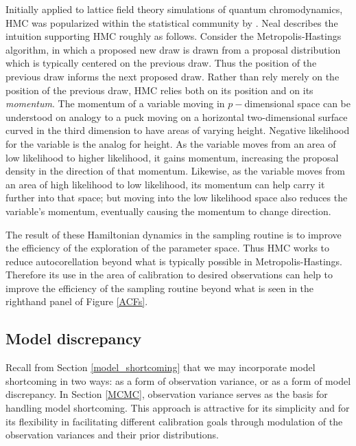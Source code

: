 \documentclass{article}
\begin{document}
Initially applied to lattice field theory simulations of quantum chromodynamics, HMC was popularized within the statistical community by \cite{Neal2011}. Neal describes the intuition supporting HMC roughly as follows. Consider the Metropolis-Hastings algorithm, in which a proposed new draw is drawn from a proposal distribution which is typically centered on the previous draw. Thus the position of the previous draw informs the next proposed draw. Rather than rely merely on the position of the previous draw, HMC relies both on its position and on its \emph{momentum}. The momentum of a variable moving in $p-$dimensional space can be understood on analogy to a puck moving on a horizontal two-dimensional surface curved in the third dimension to have areas of varying height. Negative likelihood for the variable is the analog for height. As the variable moves from an area of low likelihood to higher likelihood, it gains momentum, increasing the proposal density in the direction of that momentum. Likewise, as the variable moves from an area of high likelihood to low likelihood, its momentum can help carry it further into that space; but moving into the low likelihood space also reduces the variable's momentum, eventually causing the momentum to change direction.

The result of these Hamiltonian dynamics in the sampling routine is to improve the efficiency of the exploration of the parameter space. Thus HMC works to reduce autocorellation beyond what is typically possible in Metropolis-Hastings. Therefore its use in the area of calibration to desired observations can help to improve the efficiency of the sampling routine beyond what is seen in the righthand panel of Figure \ref{ACFs}.



\subsection{Model discrepancy}

Recall from Section  \ref{model_shortcoming} that we may incorporate model shortcoming in two ways: as a form of observation variance, or as a form of model discrepancy. In Section \ref{MCMC}, observation variance serves as the basis for handling model shortcoming. This approach is attractive for its simplicity and for its flexibility in facilitating different calibration goals through modulation of the observation variances and their prior distributions. 
\end{document}

